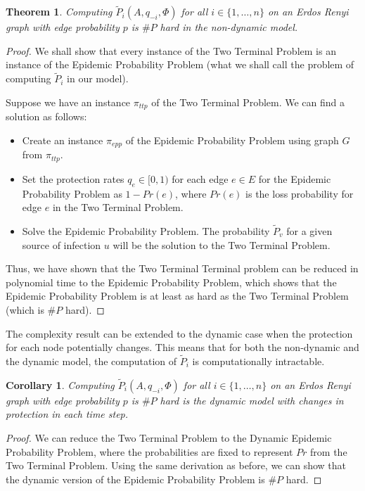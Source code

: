\documentclass{article}
\theoremstyle{plain}
\newtheorem{theorem}{Theorem}
\newtheorem{corollary}{Corollary}
\begin{document}
\begin{theorem}
  Computing $\tilde{P}_i(A, q_{-i}, \Phi)$ for all $i \in \{1, \ldots, n\}$ on an Erdos Renyi graph with edge probability $p$ is $\# P$ hard in the non-dynamic model.
\end{theorem}
\begin{proof}
  We shall show that every instance of the Two Terminal Problem is an instance of the Epidemic Probability Problem (what we shall call the problem of computing $\tilde{P}_i$ in our model).

  Suppose we have an instance $\pi_{ttp}$ of the Two Terminal Problem. We can find a solution as follows:
  \begin{itemize}
    \item Create an instance $\pi_{epp}$ of the Epidemic Probability Problem using graph $G$ from $\pi_{ttp}$.
    \item Set the protection rates $q_e \in [0,1)$ for each edge $e \in E$ for the Epidemic Probability Problem as $1 - Pr(e)$, where $Pr(e)$ is the loss probability for edge $e$ in the Two Terminal Problem.
    \item Solve the Epidemic Probability Problem. The probability $\tilde{P}_v$ for a given source of infection $u$ will be the solution to the Two Terminal Problem.
  \end{itemize}

  Thus, we have shown that the Two Terminal Terminal problem can be reduced in polynomial time to the Epidemic Probability Problem, which shows that the Epidemic Probability Problem is at least as hard as the Two Terminal Problem (which is $\# P$ hard).
\end{proof}

The complexity result can be extended to the dynamic case when the protection for each node potentially changes. This means that for both the non-dynamic and the dynamic model, the computation of $\tilde{P}_i$ is computationally intractable.

\begin{corollary}
  Computing $\tilde{P}_i(A, q_{-i}, \Phi)$ for all $i \in \{1, \ldots, n\}$ on an Erdos Renyi graph with edge probability $p$ is $\# P$ hard is the dynamic model with changes in protection in each time step.
\end{corollary}
\begin{proof}
  We can reduce the Two Terminal Problem to the Dynamic Epidemic Probability Problem, where the probabilities are fixed to represent $Pr$ from the Two Terminal Problem. Using the same derivation as before, we can show that the dynamic version of the Epidemic Probability Problem is $\# P$ hard.
\end{proof}
\end{document}
